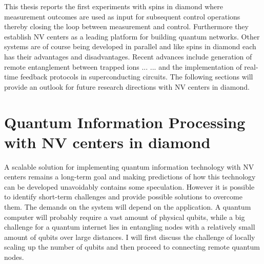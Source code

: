 This thesis reports the first experiments with spins in diamond where measurement outcomes are used as input for subsequent control operations thereby closing the loop between measurement and control. Furthermore they establish NV centers as a leading platform for building quantum networks.  Other systems are of course being developed in parallel and like spins in diamond each has their advantages and disadvantages. Recent advances include generation of remote entanglement between trapped ions ... ... and the implementation of real-time feedback protocols in superconducting circuits. The following sections will provide an outlook for future research directions with NV centers in diamond.

\section{Quantum Information Processing with NV centers in diamond}
A scalable solution for implementing quantum information technology with NV centers remains a long-term goal and making predictions of how this technology can be developed unavoidably contains some speculation. However it is possible to identify short-term challenges and provide possible solutions to overcome them. The demands on the system will depend on the application. A quantum computer will probably require a vast amount of physical qubits, while a big challenge for a quantum internet lies in entangling nodes with a relatively small amount of qubits over large distances. I will first discuss the challenge of locally scaling up the number of qubits and then proceed to connecting remote quantum nodes.





